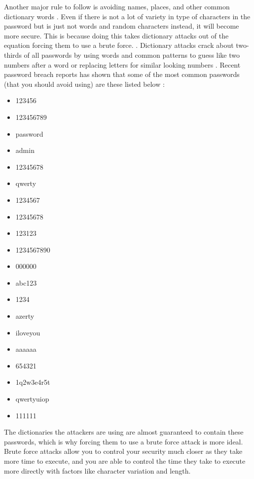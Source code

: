 \documentclass[acmsmall,nonacm]{acmart}
\begin{document}
Another major rule to follow is avoiding names, places, and other common dictionary words \cite{lee_2014}. Even if there is not a lot of variety in type of characters in the password but is just not words and random characters instead, it will become more secure. This is because doing this takes dictionary attacks out of the equation forcing them to use a brute force. \cite{rubenking_2021}. Dictionary attacks crack about two-thirds of all passwords by using words and common patterns to guess like two numbers after a word or replacing letters for similar looking numbers \cite{lee_2014}. Recent password breach reports has shown that some of the most common passwords (that you should avoid using) are these listed below \cite{nordpass}:

\begin{center}
\begin{multicols}{5}
\begin{itemize}
    \item 123456
    \item 123456789
    \item password
    \item admin
    \item 12345678
    \item qwerty
    \item 1234567
    \item 12345678
    \item 123123
    \item 1234567890
    \item 000000
    \item abc123
    \item 1234
    \item azerty
    \item iloveyou
    \item aaaaaa
    \item 654321
    \item 1q2w3e4r5t
    \item qwertyuiop
    \item 111111
\end{itemize}
\end{multicols}
\end{center}

\noindent The dictionaries the attackers are using are almost guaranteed to contain these passwords, which is why forcing them to use a brute force attack is more ideal. Brute force attacks allow you to control your security much closer as they take more time to execute, and you are able to control the time they take to execute more directly with factors like character variation and length.
  
\end{document}
